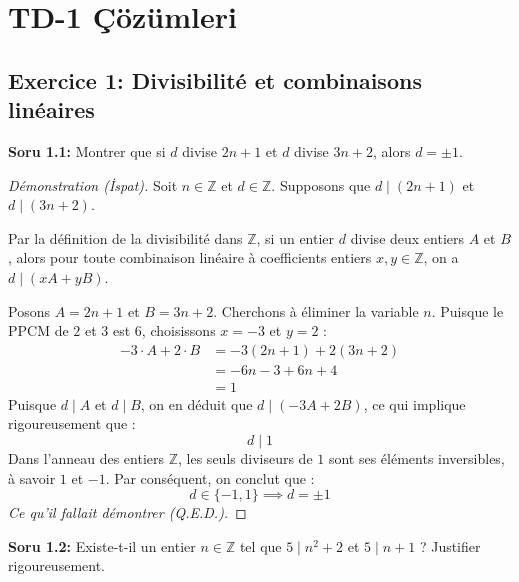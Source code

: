 \documentclass[12pt,a4paper]{report}
\begin{document}
\newpage
\section{TD-1 Çözümleri}

\subsection*{Exercice 1: Divisibilité et combinaisons linéaires}

\textbf{Soru 1.1:} Montrer que si $d$ divise $2n + 1$ et $d$ divise $3n + 2$, alors $d = \pm 1$.

\begin{proof}[Démonstration (İspat)]
Soit $n \in \mathbb{Z}$ et $d \in \mathbb{Z}$. Supposons que $d \mid (2n+1)$ et $d \mid (3n+2)$.

Par la définition de la divisibilité dans $\mathbb{Z}$, si un entier $d$ divise deux entiers $A$ et $B$, alors pour toute combinaison linéaire à coefficients entiers $x, y \in \mathbb{Z}$, on a $d \mid (xA + yB)$.

Posons $A = 2n + 1$ et $B = 3n + 2$. 
Cherchons à éliminer la variable $n$. Puisque le PPCM de $2$ et $3$ est $6$, choisissons $x = -3$ et $y = 2$ :
\begin{align*}
-3 \cdot A + 2 \cdot B &= -3(2n + 1) + 2(3n + 2) \\
&= -6n - 3 + 6n + 4 \\
&= 1
\end{align*}
Puisque $d \mid A$ et $d \mid B$, on en déduit que $d \mid (-3A + 2B)$, ce qui implique rigoureusement que :
\[ d \mid 1 \]
Dans l'anneau des entiers $\mathbb{Z}$, les seuls diviseurs de $1$ sont ses éléments inversibles, à savoir $1$ et $-1$. 
Par conséquent, on conclut que :
\[ d \in \{-1, 1\} \implies d = \pm 1 \]
\textit{Ce qu'il fallait démontrer (Q.E.D.).}
\end{proof}

\vspace{0.5cm}

\textbf{Soru 1.2:} Existe-t-il un entier $n \in \mathbb{Z}$ tel que $5 \mid n^2+2$ et $5 \mid n+1$ ? Justifier rigoureusement.
\end{document}
